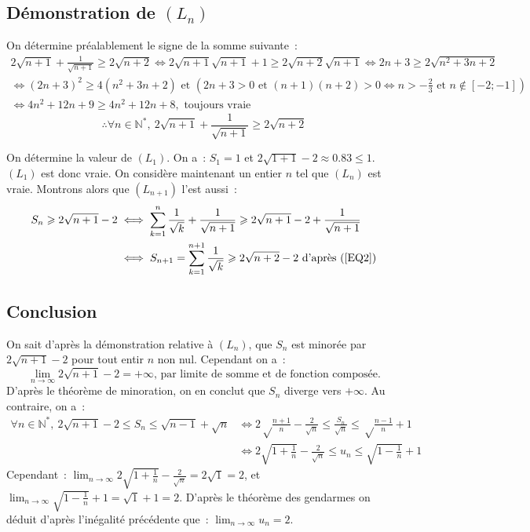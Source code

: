 \documentclass{article}
\begin{document}
  \subsection{Démonstration de $(L_n)$}
  On détermine préalablement le signe de la somme suivante~:
  \begin{align*}
    2\sqrt{n+1}+\frac{1}{\sqrt{n+1}}\geqslant2\sqrt{n+2}\iff2\sqrt{n+1}\sqrt{n+1}+1\geqslant 2\sqrt{n+2}\sqrt{n+1}\iff 2n+3\geqslant2\sqrt{n^2+3n+2} \\
    \iff (2n+3)^2\geqslant 4(n^2+3n+2)\text{ et } \left(2n+3 >0\text{ et }(n+1)(n+2)>0 \Leftrightarrow n > -\frac{2}{3}\text{ et }n\not\in[-2;-1]\right) \\
    \iff 4n^2+12n+9\geqslant 4n^2+12n +8, \text{ toujours vraie}
  \end{align*}
  \begin{equation}\label{EQ2}
    \therefore\forall n\in\mathbb{N}^*,\ 2\sqrt{n+1}+\frac{1}{\sqrt{n+1}}\geqslant2\sqrt{n+2}
  \end{equation}

  On détermine la valeur de $(L_1)$. On a~: $S_1 = 1$ et $2\sqrt{1+1}-2\approx 0.83\leqslant 1$. $(L_1)$ est donc vraie. On considère maintenant un entier $n$ tel que $(L_n)$ est vraie. Montrons alors que $(L_{n+1})$ l'est aussi~:
  \begin{align*}
    S_n\geqslant2\sqrt{n+1}-2&\iff\sum_{k=1}^n\frac{1}{\sqrt{k}}+\frac{1}{\sqrt{n+1}}\geqslant2\sqrt{n+1}-2+\frac{1}{\sqrt{n+1}}
    \\&\iff S_{n+1}=\sum_{k=1}^{n+1}\frac{1}{\sqrt{k}}\geqslant2\sqrt{n+2}-2\text{ d'après (\ref{EQ2})}
  \end{align*}
  \subsection{Conclusion}
  On sait d'après la démonstration relative à $(L_n)$, que $S_n$ est minorée par $2\sqrt{n+1}-2$ pour tout entir $n$ non nul. Cependant on a~:
  \begin{displaymath}
    \lim_{n\to\infty} 2\sqrt{n+1}-2 =+\infty\text{, par limite de somme et de fonction composée.}
  \end{displaymath}
  D'après le théorème de minoration, on en conclut que $S_n$ diverge vers $+\infty$. Au contraire, on a~:
  \begin{align*}
    \forall n\in\mathbb{N}^*,\ 2\sqrt{n+1}-2\leqslant S_n\leqslant\sqrt{n-1}+\sqrt{n} &\iff 2\sqrt\frac{n+1}{n} - \frac{2}{\sqrt{n}}\leqslant \frac{S_n}{\sqrt{n}} \leqslant \sqrt\frac{n-1}{n} + 1 \\
    &\iff 2\sqrt{1+\frac{1}{n}} - \frac{2}{\sqrt{n}}\leqslant u_n \leqslant \sqrt{1-\frac{1}{n}}+1
  \end{align*}
  Cependant~: $\lim_{n\to\infty}2\sqrt{1+\frac{1}{n}}-\frac{2}{\sqrt{n}}=2\sqrt{1}=2$, et $\lim_{n\to\infty}\sqrt{1-\frac{1}{n}}+1=\sqrt{1}+1=2$. D'après le théorème des gendarmes on déduit d'après l'inégalité précédente que~: $\lim_{n\to\infty}u_n=2$.
\end{document}
